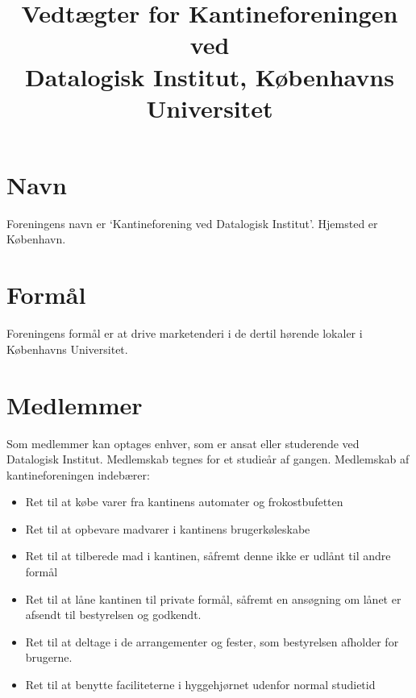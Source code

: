 \documentclass[a4paper, 10pt]{article}
\title{Vedtægter for Kantineforeningen ved \\ Datalogisk Institut,
Københavns Universitet}
\author{}
\date{}
\begin{document}
\maketitle

\section{Navn}

\label{navn} Foreningens navn er `Kantineforening ved Datalogisk
Institut'. Hjemsted er København.

\section{Formål}

\label{formaal} Foreningens formål er at drive marketenderi i de
dertil hørende lokaler i Kø\-benhavns Universitet.

\section{Medlemmer}

\label{medlemmer} Som medlemmer kan optages enhver, som er ansat eller
studerende ved Datalogisk Institut. Medlemskab tegnes for et studieår
af gangen. Medlemskab af kantineforeningen indebærer:

\medskip

\begin{itemize}

\item Ret til at købe varer fra kantinens automater og frokostbufetten

\item Ret til at opbevare madvarer i kantinens brugerkøleskabe

\item Ret til at tilberede mad i kantinen, såfremt denne ikke er
udlånt til andre formål

\item Ret til at låne kantinen til private formål, såfremt en
ansøgning om lånet er afsendt til bestyrelsen og godkendt.

\item Ret til at deltage i de arrangementer og fester, som bestyrelsen
afholder for brugerne.

\item Ret til at benytte faciliteterne i hyggehjørnet udenfor normal
studietid

\end{itemize}
\end{document}
